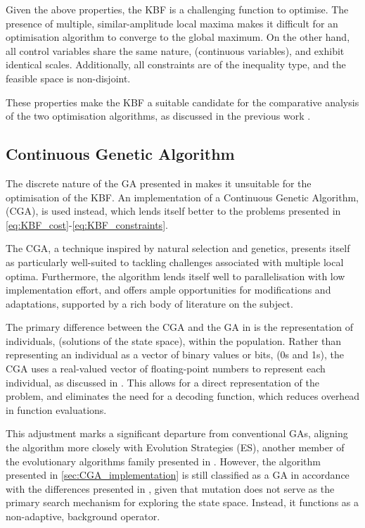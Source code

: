 \documentclass[10pt]{article}
\begin{document}
\begin{multicols}{2}
Given the above properties, the KBF is a challenging function to optimise. The presence of multiple, similar-amplitude local maxima makes it difficult for an optimisation algorithm to converge to the global maximum. On the other hand, all control variables share the same nature, (continuous variables), and exhibit identical scales. Additionally, all constraints are of the inequality type, and the feasible space is non-disjoint.

These properties make the KBF a suitable candidate for the comparative analysis of the two optimisation algorithms, as discussed in the previous work \cite{ELBELTAGY1999639}.

\subsection{Continuous Genetic Algorithm}

The discrete nature of the GA presented in \cite{parks2023geneticalgorithms} makes it unsuitable for the optimisation of the KBF. An implementation of a Continuous Genetic Algorithm, (CGA), is used instead, which lends itself better to the problems presented in \ref{eq:KBF_cost}-\ref{eq:KBF_constraints}.

The CGA, a technique inspired by natural selection and genetics, presents itself as particularly well-suited to tackling challenges associated with multiple local optima. Furthermore, the algorithm lends itself well to parallelisation with low implementation effort, and offers ample opportunities for modifications and adaptations, supported by a rich body of literature on the subject.

The primary difference between the CGA and the GA in \cite{parks2023geneticalgorithms} is the representation of individuals, (solutions of the state space), within the population. Rather than representing an individual as a vector of binary values or bits, (0s and 1s), the CGA uses a real-valued vector of floating-point numbers to represent each individual, as discussed in \cite{PGA}. This allows for a direct representation of the problem, and eliminates the need for a decoding function, which reduces overhead in function evaluations.

This adjustment marks a significant departure from conventional GAs, aligning the algorithm more closely with Evolution Strategies (ES), another member of the evolutionary algorithms family presented in \cite{salimans2017evolution}. However, the algorithm presented in \ref{sec:CGA_implementation} is still classified as a GA in accordance with the differences presented in \cite{10.1007/BFb0029787}, given that mutation does not serve as the primary search mechanism for exploring the state space. Instead, it functions as a non-adaptive, background operator.


\end{multicols}
\end{document}
